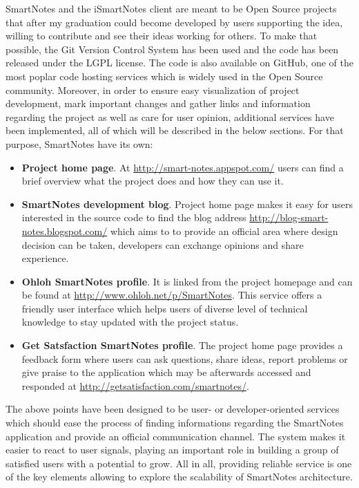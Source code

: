 SmartNotes and the iSmartNotes client are meant to be Open Source projects that after my graduation could become developed by users supporting the idea, willing to contribute and see their ideas working for others. To make that possible, the Git Version Control System has been used and the code has been released under the LGPL license. The code is also available on GitHub, one of the most poplar code hosting services which is widely used in the Open Source community. Moreover, in order to ensure easy visualization of project development, mark important changes and gather links and information regarding the project as well as care for user opinion, additional services have been implemented, all of which will be described in the below sections. For that purpose, SmartNotes have its own:
\begin{itemize}
\item{\textbf{Project home page}. At \url{http://smart-notes.appspot.com/} users can find a brief overview what the project does and how they can use it.}
\item{\textbf{SmartNotes development blog}. Project home page makes it easy for users interested in the source code to find the blog address \url{http://blog-smart-notes.blogspot.com/} which aims to to provide an official area where design decision can be taken, developers can exchange opinions and share experience.}
\item{\textbf{Ohloh SmartNotes profile}. It is linked from the project homepage and can be found at \url{http://www.ohloh.net/p/SmartNotes}. This service offers a friendly user interface which helps users of diverse level of technical knowledge to stay updated with the project status.}
\item{\textbf{Get Satsfaction SmartNotes profile}. The project home page provides a feedback form where users can ask questions, share ideas, report problems or give praise to the application which may be afterwards accessed and responded at \url{http://getsatisfaction.com/smartnotes/}.}
\end{itemize}
The above points have been designed to be user- or developer-oriented services which should ease the process of finding informations regarding the SmartNotes application and provide an official communication channel. The system makes it easier to react to user signals, playing an important role in building a group of satisfied users with a potential to grow. All in all, providing reliable service is one of the key elements allowing to explore the scalability of SmartNotes architecture.
 
